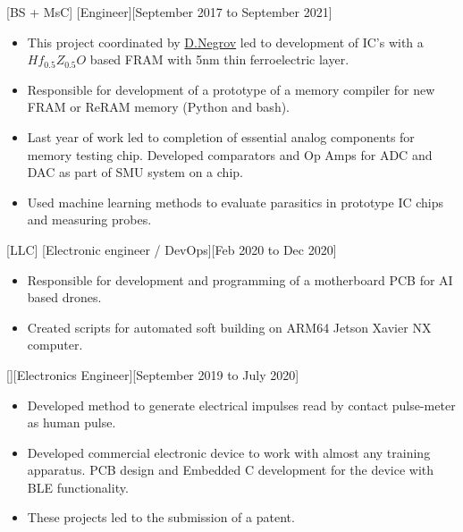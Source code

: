 \documentclass{article}
\begin{document}
[BS + MsC]
[Engineer][September 2017 to September 2021]

\begin{itemize}
\item This project coordinated by  \href{https://www.scopus.com/authid/detail.uri?authorId=56272708000}{D.Negrov}   led to development of IC's with a $Hf_{0.5} Z_{0.5} O $ based  FRAM with 5nm thin ferroelectric layer.
\item Responsible for development of a prototype of a memory  compiler for new FRAM or ReRAM memory (Python and bash).
\item Last year of work led to completion of essential analog components for memory testing chip. Developed comparators and Op Amps for ADC and DAC as part of SMU system on a chip.
\item Used machine learning methods to evaluate parasitics in prototype IC chips and measuring probes.

\end{itemize}
 

 
[LLC]
[Electronic engineer / DevOps][Feb 2020 to Dec 2020]
 
\begin{itemize}
\item Responsible for development and programming of a motherboard PCB for AI based drones.
\item Created scripts for automated soft building on ARM64 Jetson Xavier NX computer.
\end{itemize}
 
 
[][Electronics Engineer][September 2019 to July 2020]
 
\begin{itemize}
\item Developed method to generate electrical impulses read by contact pulse-meter as human pulse. 
\item Developed commercial electronic device to work with almost any training apparatus. PCB design and Embedded C development for the device with BLE functionality. 
\item These projects led to the submission of a patent.
\end{itemize}
 
\end{document}
